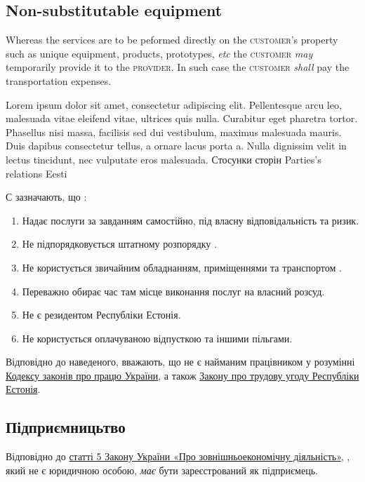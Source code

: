 \begin{Form}
\begin{paracol}{3}
{        \subsection{Non-substitutable equipment}
        Whereas the services are to be peformed directly on the \textsc{customer}'s property such as unique equipment, products, prototypes, \textit{etc} the \textsc{customer} \textit{may} temporarily provide it to the \textsc{provider}. In such case the \textsc{customer} \textit{shall} pay the transportation expenses.}
        {Lorem ipsum dolor sit amet, consectetur adipiscing elit. Pellentesque arcu leo, malesuada vitae eleifend vitae, ultrices quis nulla. Curabitur eget pharetra tortor. Phasellus nisi massa, facilisis sed dui vestibulum, maximus malesuada mauris. Duis dapibus consectetur tellus, a ornare lacus porta a. Nulla dignissim velit in lectus tincidunt, nec vulputate eros malesuada. }
      \multibreak
      \clause
        {Стосунки сторін}
        {Parties's relations}
        {Eesti}
        {С зазначають, що :
        \begin{enumerate}
          \item Надає послуги за завданням самостійно, під власну відповідальність та ризик.
          \item Не підпорядковується штатному розпорядку .
          \item Не користується звичайним обладнанням, приміщеннями та транспортом .
          \item Переважно обирає час там місце виконання послуг на власний розсуд.
          \item Не є резидентом Республіки Естонія.
          \item Не користується оплачуваною відпусткою та іншими пільгами.
        \end{enumerate}

        Відповідно до наведеного,  вважають, що  не є найманим працівником  у розумінні \href{http://zakon2.rada.gov.ua/laws/show/322-08}{Кодексу законів про працю України}, а також \href{http://zakon24.ee/zakon-o-trudovom-dogovore/}{Закону про трудову угоду Республіки Естонія}.

        \subsection{Підприємницьтво}
        Відповідно до \href{http://zakon3.rada.gov.ua/laws/show/959-12/parao138\#o138}{статті 5 Закону України «Про зовнішньоекономічну діяльність»}, , який не є юридичною особою, \textit{має} бути зареєстрований як підприємець.

}
\end{paracol}
\end{Form}
